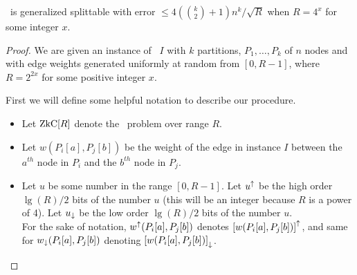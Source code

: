 \begin{lemma}
	\zkclique~is generalized splittable with error $\leq 4(\binom{k}{2} + 1) n^k/\sqrt{R}$ when $R=4^{x}$ for some integer $x$. 
	\label{lem:zkcSplitConvenientRange}
\end{lemma}
\begin{proof}
	We are given an instance of \zkclique~$I$ with $k$ partitions, $P_1, \ldots, P_k$ of $n$ nodes and with edge weights generated uniformly at random from $[0,R-1]$, where $R = 2^{2x}$ for some positive integer $x$.

	First we will define some helpful notation to describe our procedure.
	\begin{itemize}
		\item Let $\ZkC[R]$ denote the \zkclique~problem over range $R$.
		\item Let $w(P_i[a],P_j[b])$ be the weight of the edge in instance $I$ between the $a^{th}$ node in  $P_i$ and the $b^{th}$ node in $P_j$.
		\item Let $u$ be some number in the range $[0,R-1]$. Let ${u}^\uparrow$ be the high order $\lg(R)/2$ bits of the number $u$ (this will be an integer because $R$ is a power of 4). Let ${u}_\downarrow$ be the low order $\lg(R)/2$ bits of the number $u$.\\
		For the sake of notation, ${w}^\uparrow (P_i[a], P_j[b])$ denotes ${[w (P_i[a], P_j[b])]}^\uparrow$, and same for ${w}_\downarrow (P_i[a], P_j[b])$ denoting ${[w (P_i[a], P_j[b])]}_\downarrow$.
	\end{itemize}


\end{proof}
